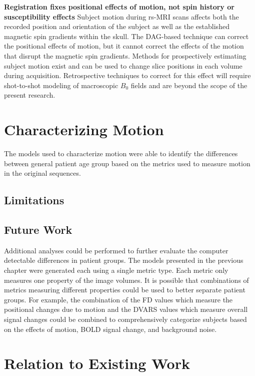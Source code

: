 \textbf{Registration fixes positional effects of motion, not spin history or susceptibility effects}
Subject motion during rs-MRI scans affects both the recorded position and orientation of the subject as well as the established magnetic spin gradients within the skull. The DAG-based technique can correct the positional effects of motion, but it cannot correct the effects of the motion that disrupt the magnetic spin gradients. Methods for prospectively estimating subject motion exist and can be used to change slice positions in each volume during acquisition. Retrospective techniques to correct for this effect will require shot-to-shot modeling of macroscopic $B_0$ fields and are beyond the scope of the present research.

\section{Characterizing Motion}

The models used to characterize motion were able to identify the differences between general patient age group based on the metrics used to measure motion in the original sequences.

\subsection{Limitations}

\subsection{Future Work}

Additional analyses could be performed to further evaluate the computer detectable differences in patient groups. The models presented in the previous chapter were generated each using a single metric type. Each metric only measures one property of the image volumes. It is possible that combinations of metrics measuring different properties could be used to better separate patient groups. For example, the combination of the FD values which measure the positional changes due to motion and the DVARS values which measure overall signal changes could be combined to comprehensively categorize subjects based on the effects of motion, BOLD signal change, and background noise.



\section{Relation to Existing Work}

